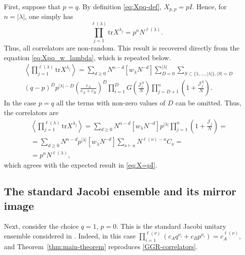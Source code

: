 \documentclass{article}
\newcommand{\tr}{\mathrm{tr}}
\theoremstyle{plain}
\theoremstyle{definition}
\numberwithin{equation}{section}
\begin{document}
First, suppose that $p=q$. By definition \eqref{eq:Xpq-def}, $X_{p,p}=pI$. Hence, for $n=|\lambda|$, one simply has
\begin{equation}
    \label{eq:X=pI}
    \prod_{j=1}^{\ell(\lambda)}\tr X^{\lambda_j}
    =p^nN^{\ell(\lambda)}.
\end{equation}
Thus, all correlators are non-random. This result is recovered directly from the equation \eqref{eq:Xpq_w_lambda}, which is repeated below.
\begin{equation}
    \label{eq:Xpq_w_lambda_repeat}
    \begin{aligned}
        & \left\langle \prod_{j=1}^{\ell(\lambda)} \tr X^{\lambda_{j}} \right\rangle = \sum\limits_{d\ge 0}  N^{n- d} [w_\lambda N^{-d}] \sum_{D=0}^{|\lambda|}\sum_{S\subset \{1,\dots,|\lambda|\}, |S| = D} \\
        & (q-p)^{D} p^{|\lambda|-D} \left(\frac{c_{A}}{c_{A}+c_{B}}\right)^{D} \prod_{i=1}^{D} G\left(\frac{\mathcal{J}_{i}^S}{N} \right) \prod_{j=D+1}^n \left(1+\frac{\mathcal{J}_{j}^S}{N}\right).
    \end{aligned}
\end{equation}
In the case $p=q$ all the terms with non-zero values of $D$ can be omitted. Thus, the correlators are
\begin{equation}
    \label{eq:p=q_inter}
    \begin{aligned}
        & \left\langle \prod_{j=1}^{\ell(\lambda)} \tr X^{\lambda_{j}} \right\rangle = \sum\limits_{d\ge 0}  N^{n- d} [w_\lambda N^{-d}]  p^{|\lambda|}  \prod_{j=1}^n \left(1+\frac{\mathcal{J}_{j}}{N}\right) = \\
        &  = \sum\limits_{d\ge 0}  N^{n- d} p^{|\lambda|}[w_\lambda N^{-d}] \sum_{\nu \vdash n}    N^{\ell(\nu)-n} C_\nu = \\
        & = p^{n}N^{\ell(\lambda)},
    \end{aligned}
\end{equation}
which agrees with the expected result in \eqref{eq:X=pI}.

\subsection{The standard Jacobi ensemble and its mirror image}
\label{subs:mirror}

Next, consider the choice $q=1$, $p=0$. This is the standard Jacobi unitary ensemble considered in \cite{gisonni2021jacobi}. Indeed, in this case $\prod_{i=1}^{\ell(\nu)}\left( c_A q^{\nu_{i}} + c_B p^{\nu_{i}} \right)=c_A^{\ell(\nu)}$, and Theorem~\ref{thm:main-theorem} reproduces \eqref{GGR-correlators}.
\end{document}
